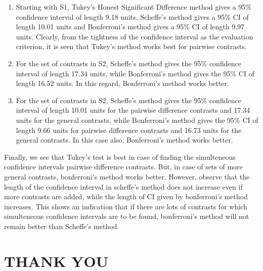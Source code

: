 \documentclass[]{article}
\begin{document}
\begin{enumerate}
\def\labelenumi{\arabic{enumi}.}
\item
  Starting with S1, Tukey's Honest Significant Difference method gives a
  95\% confidence interval of length 9.18 units, Scheffe's method gives
  a 95\% CI of length 10.01 units and Bonferroni's method gives a 95\%
  CI of length 9.97 units. Clearly, from the tightness of the confidence
  interval as the evaluation criterion, it is seen that Tukey's method
  works best for pairwise contrasts.
\item
  For the set of contrasts in S2, Scheffe's method gives the 95\%
  confidence interval of length 17.34 units, while Bonferroni's method
  gives the 95\% CI of length 16.52 units. In this regard, Bonferroni's
  method works better.
\item
  For the set of contrasts in S2, Scheffe's method gives the 95\%
  confidence interval of length 10.01 units for the pairwise difference
  contrasts and 17.34 units for the general contrasts, while
  Bonferroni's method gives the 95\% CI of length 9.66 units for
  pairwise difference contrasts and 16.73 units for the general
  contrasts. In this case also, Bonferroni's method works better.
\end{enumerate}

Finally, we see that Tukey's test is best in case of finding the
simulteneous confidence intervals pairwise difference contrasts. But, in
case of sets of more general contrasts, bonferroni's method works
better. However, observe that the length of the confidence interval in
scheffe's method does not increase even if more contrasts are added,
while the length of CI given by bonferroni's method increases. This
shows an indication that if there are lots of contrasts for which
simulteneous confidence intervals are to be found, bonferroni's method
will not remain better than Scheffe's method.

\section{THANK YOU}\label{thank-you}
\end{document}
